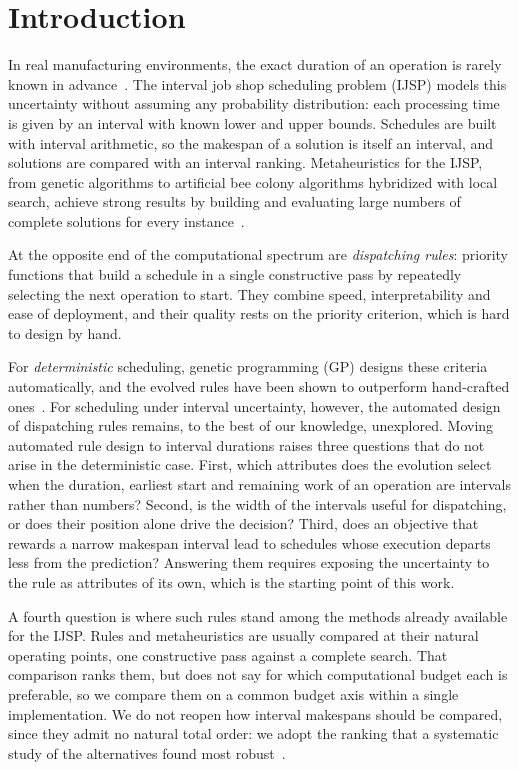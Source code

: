 \documentclass[preprint,number,sort&compress,12pt]{elsarticle}
\begin{document}
\section{Introduction}
\label{sec:intro}

In real manufacturing environments, the exact duration of an operation
is rarely known in advance~\citep{Allahverdi2022}. The interval job shop
scheduling problem (IJSP) models this uncertainty without assuming any
probability distribution: each processing time is given by an interval
with known lower and upper bounds. Schedules are built with interval
arithmetic, so the makespan of a solution is itself an interval, and
solutions are compared with an interval ranking. Metaheuristics for the
IJSP, from genetic algorithms to artificial bee colony algorithms
hybridized with local search, achieve strong results by building and
evaluating large numbers of complete solutions for every
instance~\citep{DiazGA2020,DiazABC2022,DiazFEABC2023,DiazICAE2023}.

At the opposite end of the computational spectrum are \emph{dispatching
rules}: priority functions that build a schedule in a single constructive
pass by repeatedly selecting the next operation to start. They combine
speed, interpretability and ease of deployment, and their quality rests
on the priority criterion, which is hard to design by hand.

For \emph{deterministic} scheduling, genetic programming (GP) designs
these criteria automatically, and the evolved rules have been shown to
outperform hand-crafted ones~\citep{Branke2016,Nguyen2017}. For
scheduling under interval uncertainty, however, the automated design of
dispatching rules remains, to the best of our knowledge, unexplored.
Moving automated rule design to interval durations raises three
questions that do not arise in the deterministic case. First, which
attributes does the evolution select when the duration, earliest start
and remaining work of an operation are intervals rather than numbers?
Second, is the width of the intervals useful for dispatching, or does
their position alone drive the decision? Third, does an objective that
rewards a narrow makespan interval lead to schedules whose execution
departs less from the prediction? Answering them requires exposing the
uncertainty to the rule as attributes of its own, which is the starting
point of this work.

A fourth question is where such rules stand among the methods already
available for the IJSP. Rules and metaheuristics are usually compared at
their natural operating points, one constructive pass against a complete
search. That comparison ranks them, but does not say for which
computational budget each is preferable, so we compare them on a common
budget axis within a single implementation. We do not reopen how
interval makespans should be compared, since they admit no natural total
order: we adopt the ranking that a systematic study of the alternatives
found most robust~\citep{DiazGA2020}.
\end{document}
